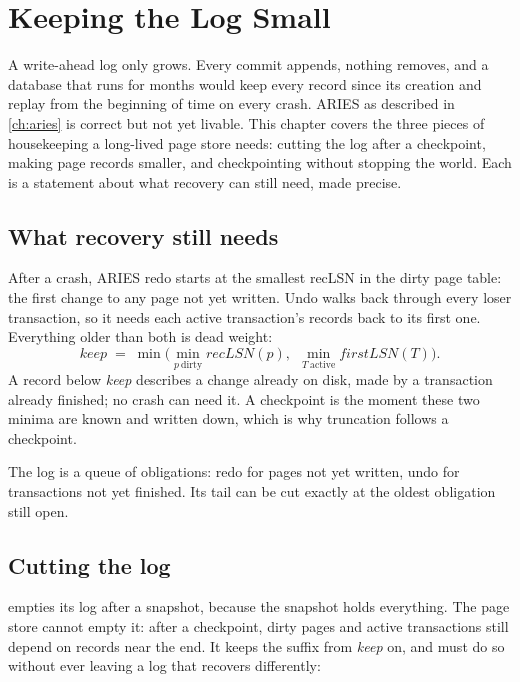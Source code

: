 \chapter{Keeping the Log Small}
\label{ch:logkeep}

A write-ahead log only grows. Every commit appends, nothing removes, and a
database that runs for months would keep every record since its creation and
replay from the beginning of time on every crash. ARIES as described in
\cref{ch:aries} is correct but not yet livable. This chapter covers the three
pieces of housekeeping a long-lived page store needs: cutting the log after a
checkpoint, making page records smaller, and checkpointing without stopping
the world. Each is a statement about what recovery can still need, made
precise.

\section{What recovery still needs}

After a crash, ARIES redo starts at the smallest recLSN in the dirty page
table: the first change to any page not yet written. Undo walks back through
every loser transaction, so it needs each active transaction's records back
to its first one. Everything older than both is dead weight:
\[
\mathit{keep} \;=\; \min\Big(\min_{p\ \text{dirty}} \mathit{recLSN}(p),\ \ \min_{T\ \text{active}} \mathit{firstLSN}(T)\Big).
\]
A record below \textit{keep} describes a change already on disk, made by a
transaction already finished; no crash can need it. A checkpoint is the moment
these two minima are known and written down, which is why truncation follows a
checkpoint.

\begin{keyidea}
The log is a queue of obligations: redo for pages not yet written, undo for
transactions not yet finished. Its tail can be cut exactly at the oldest
obligation still open.
\end{keyidea}

\section{Cutting the log}

 empties its log after a snapshot, because the snapshot
holds everything. The page store cannot empty it: after a checkpoint, dirty
pages and active transactions still depend on records near the end. It keeps
the suffix from \textit{keep} on, and must do so without ever leaving a log
that recovers differently:

